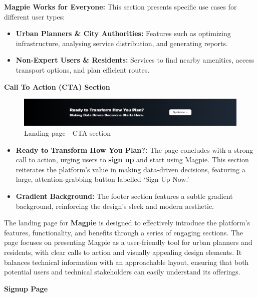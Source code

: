 \textbf{Magpie Works for Everyone:} This section presents specific use cases for
different user types:
\begin{itemize}
    \item{}  \textbf{Urban Planners \& City Authorities:} Features such as
    optimizing infrastructure, analysing service distribution, and generating
    reports.
    \item{} \textbf{Non-Expert Users \& Residents:} Services to find nearby
    amenities, access transport options, and plan efficient routes.
\end{itemize}

\newpage{}

\textbf{Call To Action (CTA) Section}

\begin{figure}[htbp]
    \centering{}
    \includegraphics[width=1\textwidth]{images/site/landing/landing_5_cta.png}
    \caption{Landing page {-} CTA section}
\end{figure}

\begin{itemize}
    \item{} \textbf{Ready to Transform How You Plan?:} The page concludes with a
    strong call to action, urging users to \textbf{sign up} and start using
    Magpie. This section reiterates the platform's value in making data{-}driven
    decisions, featuring a large, attention{-}grabbing button labelled `Sign Up
    Now.'
    \item{} \textbf{Gradient Background:} The footer section features a subtle
    gradient background, reinforcing the design's sleek and modern aesthetic.
\end{itemize}

The landing page for \textbf{Magpie} is designed to effectively introduce the
platform's features, functionality, and benefits through a series of engaging
sections. The page focuses on presenting Magpie as a user{-}friendly tool for
urban planners and residents, with clear calls to action and visually appealing
design elements. It balances technical information with an approachable layout,
ensuring that both potential users and technical stakeholders can easily
understand its offerings.

\textbf{Signup Page}

